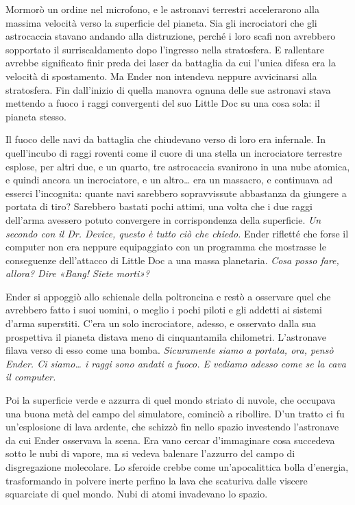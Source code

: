 {Mormorò un ordine nel microfono, e le astronavi terrestri accelerarono
	alla massima velocità verso la superficie del pianeta. Sia gli
	incrociatori che gli astrocaccia stavano andando alla distruzione,
	perché i loro scafi non avrebbero sopportato il surriscaldamento dopo
	l'ingresso nella stratosfera. E rallentare avrebbe significato finir
	preda dei laser da battaglia da cui l'unica difesa era la velocità di
	spostamento. Ma Ender non intendeva neppure avvicinarsi alla
	stratosfera. Fin dall'inizio di quella manovra ognuna delle sue
	astronavi stava mettendo a fuoco i raggi convergenti del suo Little Doc
	su una cosa sola: il pianeta stesso.}

{Il fuoco delle navi da battaglia che chiudevano verso di loro era
	infernale. In quell'incubo di raggi roventi come il cuore di una stella
	un incrociatore terrestre esplose, per altri due, e un quarto, tre
	astrocaccia svanirono in una nube atomica, e quindi ancora un
	incrociatore, e un altro\ldots{} era un massacro, e continuava ad
	esserci l'incognita: quante navi sarebbero sopravvissute abbastanza da
	giungere a portata di tiro? Sarebbero bastati pochi attimi, una volta
	che i due raggi dell'arma avessero potuto convergere in corrispondenza
	della superficie. \emph{Un secondo con il Dr. Device, questo è tutto ciò
		che chiedo.} Ender rifletté che forse il computer non era neppure
	equipaggiato con un programma che mostrasse le conseguenze dell'attacco
	di Little Doc a una massa planetaria. \emph{Cosa posso fare, allora?
		Dire «Bang! Siete morti»?}}

{Ender si appoggiò allo schienale della poltroncina e restò a osservare
	quel che avrebbero fatto i suoi uomini, o meglio i pochi piloti e gli
	addetti ai sistemi d'arma superstiti. C'era un solo incrociatore,
	adesso, e osservato dalla sua prospettiva il pianeta distava meno di
	cinquantamila chilometri. L'astronave filava verso di esso come una
	bomba. \emph{Sicuramente siamo a portata, ora, pensò Ender. Ci
		siamo\ldots{} i raggi sono andati a fuoco. E vediamo adesso come se la
		cava il computer.}}

{Poi la superficie verde e azzurra di quel mondo striato di nuvole, che
	occupava una buona metà del campo del simulatore, cominciò a ribollire.
	D'un tratto ci fu un'esplosione di lava ardente, che schizzò fin nello
	spazio investendo l'astronave da cui Ender osservava la scena. Era vano
	cercar d'immaginare cosa succedeva sotto le nubi di vapore, ma si vedeva
	balenare l'azzurro del campo di disgregazione molecolare. Lo sferoide
	crebbe come un'apocalittica bolla d'energia, trasformando in polvere
	inerte perfino la lava che scaturiva dalle viscere squarciate di quel
	mondo. Nubi di atomi invadevano lo spazio.}

